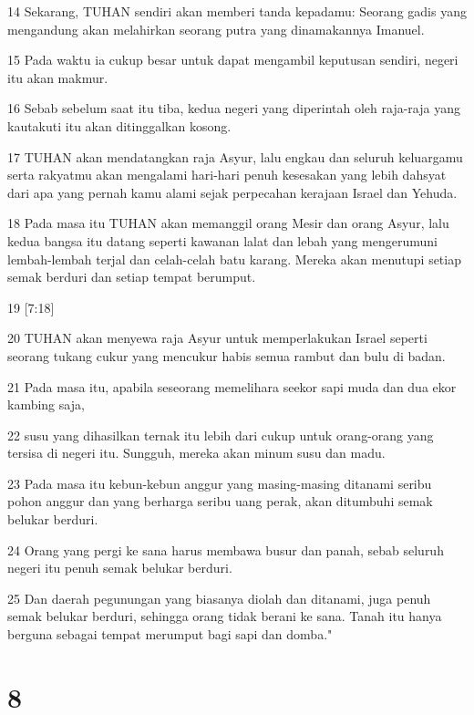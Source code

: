 \par 14 Sekarang, TUHAN sendiri akan memberi tanda kepadamu: Seorang gadis yang mengandung akan melahirkan seorang putra yang dinamakannya Imanuel.
\par 15 Pada waktu ia cukup besar untuk dapat mengambil keputusan sendiri, negeri itu akan makmur.
\par 16 Sebab sebelum saat itu tiba, kedua negeri yang diperintah oleh raja-raja yang kautakuti itu akan ditinggalkan kosong.
\par 17 TUHAN akan mendatangkan raja Asyur, lalu engkau dan seluruh keluargamu serta rakyatmu akan mengalami hari-hari penuh kesesakan yang lebih dahsyat dari apa yang pernah kamu alami sejak perpecahan kerajaan Israel dan Yehuda.
\par 18 Pada masa itu TUHAN akan memanggil orang Mesir dan orang Asyur, lalu kedua bangsa itu datang seperti kawanan lalat dan lebah yang mengerumuni lembah-lembah terjal dan celah-celah batu karang. Mereka akan menutupi setiap semak berduri dan setiap tempat berumput.
\par 19 [7:18]
\par 20 TUHAN akan menyewa raja Asyur untuk memperlakukan Israel seperti seorang tukang cukur yang mencukur habis semua rambut dan bulu di badan.
\par 21 Pada masa itu, apabila seseorang memelihara seekor sapi muda dan dua ekor kambing saja,
\par 22 susu yang dihasilkan ternak itu lebih dari cukup untuk orang-orang yang tersisa di negeri itu. Sungguh, mereka akan minum susu dan madu.
\par 23 Pada masa itu kebun-kebun anggur yang masing-masing ditanami seribu pohon anggur dan yang berharga seribu uang perak, akan ditumbuhi semak belukar berduri.
\par 24 Orang yang pergi ke sana harus membawa busur dan panah, sebab seluruh negeri itu penuh semak belukar berduri.
\par 25 Dan daerah pegunungan yang biasanya diolah dan ditanami, juga penuh semak belukar berduri, sehingga orang tidak berani ke sana. Tanah itu hanya berguna sebagai tempat merumput bagi sapi dan domba."

\chapter{8}


